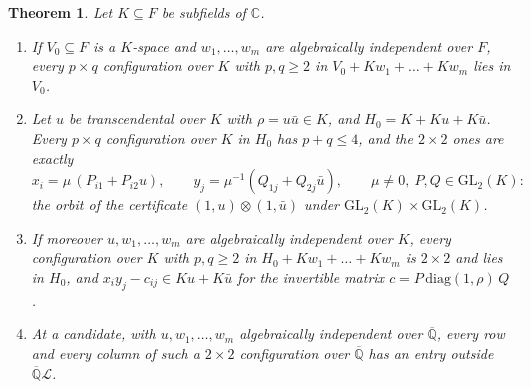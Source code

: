 \documentclass[11pt,a4paper]{article}
\theoremstyle{plain}
\newtheorem{theorem}{Theorem}[section]
\theoremstyle{definition}
\newcommand{\C}{\mathbb{C}}
\newcommand{\Alg}{\overline{\mathbb{Q}}}
\newcommand{\Logs}{\mathcal{L}}
\begin{document}
\begin{theorem}\label{thm:separation-normal}
Let $K\subseteq F$ be subfields of $\C$.
\begin{enumerate}[label=\textup{(\alph*)}]
\item If $V_{0}\subseteq F$ is a $K$-space and $w_{1},\dots,w_{m}$ are algebraically independent over $F$, every
$p\times q$ configuration over $K$ with $p,q\ge2$ in $V_{0}+Kw_{1}+\dots+Kw_{m}$ lies in $V_{0}$.
\item Let $u$ be transcendental over $K$ with $\rho=u\bar u\in K$, and $H_{0}=K+Ku+K\bar u$. Every $p\times q$
configuration over $K$ in $H_{0}$ has $p+q\le4$, and the $2\times2$ ones are exactly
\[
  x_{i}=\mu\,(P_{i1}+P_{i2}u),\qquad y_{j}=\mu^{-1}(Q_{1j}+Q_{2j}\bar u),\qquad \mu\neq0,\ P,Q\in\mathrm{GL}_{2}(K):
\]
the orbit of the certificate $(1,u)\otimes(1,\bar u)$ under $\mathrm{GL}_{2}(K)\times\mathrm{GL}_{2}(K)$.
\item If moreover $u,w_{1},\dots,w_{m}$ are algebraically independent over $K$, every configuration over $K$ with
$p,q\ge2$ in $H_{0}+Kw_{1}+\dots+Kw_{m}$ is $2\times2$ and lies in $H_{0}$, and $x_{i}y_{j}-c_{ij}\in Ku+K\bar u$
for the invertible matrix $c=P\,\mathrm{diag}(1,\rho)\,Q$.
\item At a candidate, with $u,w_{1},\dots,w_{m}$ algebraically independent over $\Alg$, every row and every
column of such a $2\times2$ configuration over $\Alg$ has an entry outside $\Alg\Logs$.
\end{enumerate}
\end{theorem}
\end{document}

